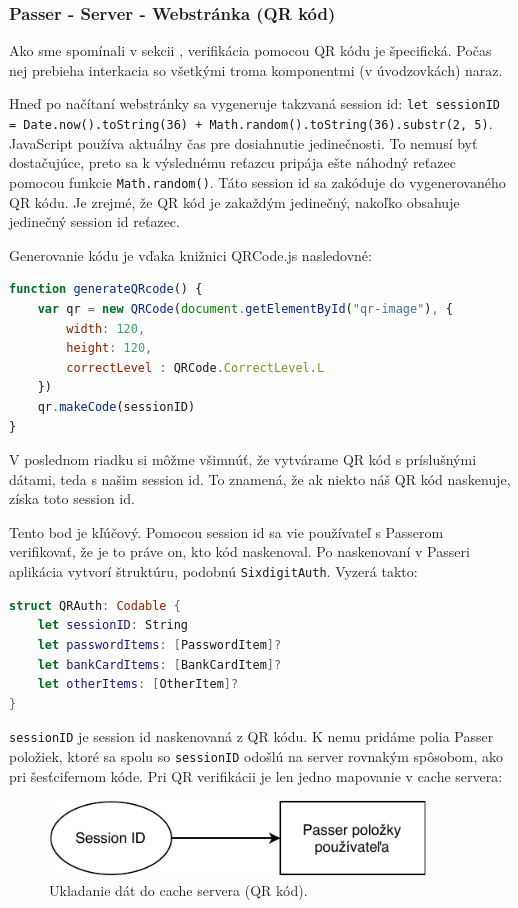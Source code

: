 \subsubsection{Passer - Server - Webstránka (QR kód)}
Ako sme spomínali v sekcii , verifikácia pomocou QR kódu je špecifická. Počas nej prebieha interkacia so všetkými troma komponentmi (v úvodzovkách) naraz. 

Hneď po načítaní webstránky sa vygeneruje takzvaná session id: \texttt{let sessionID = Date.now().toString(36) + Math.random().toString(36).substr(2, 5)}. JavaScript používa aktuálny čas pre dosiahnutie jedinečnosti. To nemusí byť dostačujúce, preto sa k výslednému reťazcu pripája ešte náhodný reťazec pomocou funkcie \texttt{Math.random()}. Táto session id sa zakóduje do vygenerovaného QR kódu. Je zrejmé, že QR kód je zakaždým jedinečný, nakoľko obsahuje jedinečný session id reťazec.

Generovanie kódu je vďaka knižnici QRCode.js nasledovné: 
\newline
\begin{lstlisting}[language=JavaScript, basicstyle=\small]
function generateQRcode() {
    var qr = new QRCode(document.getElementById("qr-image"), {
        width: 120,
        height: 120,
        correctLevel : QRCode.CorrectLevel.L
    })
    qr.makeCode(sessionID)
}
\end{lstlisting}
\leavevmode\newline
\noindent V poslednom riadku si môžme všimnúť, že vytvárame QR kód s príslušnými dátami, teda s našim session id. To znamená, že ak niekto náš QR kód naskenuje, získa toto session id.

Tento bod je kľúčový. Pomocou session id sa vie používateľ s Passerom verifikovať, že je to práve on, kto kód naskenoval. Po naskenovaní v Passeri aplikácia vytvorí štruktúru, podobnú \texttt{SixdigitAuth}. Vyzerá takto:
\newline
\begin{lstlisting}[language=Swift, basicstyle=\small]
struct QRAuth: Codable {
    let sessionID: String
    let passwordItems: [PasswordItem]?
    let bankCardItems: [BankCardItem]?
    let otherItems: [OtherItem]?
}
\end{lstlisting}
\leavevmode\newline
\noindent \texttt{sessionID} je session id naskenovaná z QR kódu. K nemu pridáme polia Passer položiek, ktoré sa spolu so \texttt{sessionID} odošlú na server rovnakým spôsobom, ako pri šesťcifernom kóde. Pri QR verifikácii je len jedno mapovanie v cache servera: 
\newline
\begin{figure}[H]
  \centering
  \includegraphics[width=10cm]{img/cache-diagramQR.pdf}
  \caption{Ukladanie dát do cache servera (QR kód).}
  \label{cache-diagramQR}
\end{figure}

